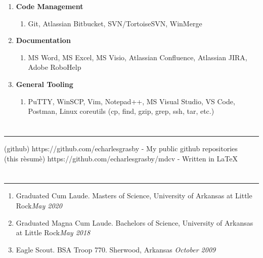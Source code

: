 \documentclass[11pt]{article}
\newcommand{\ualr}{University of Arkansas at Little Rock}
\newcommand{\uppr}[3]{ \noindent\MakeUppercase{{\fontsize{#2}{#3} \selectfont {#1}}} }
\begin{document}
\begin{enumerate}[topsep=0pt, partopsep=0pt, label=\null]
\begin{enumerate}[topsep=0pt, partopsep=0pt, label=\null]
  \end{enumerate}
\item \textbf{Code Management}
  \begin{enumerate}[topsep=0pt, partopsep=0pt, label=\null]
  \item Git, Atlassian Bitbucket, SVN/TortoiseSVN, WinMerge
  \end{enumerate}
\item \textbf{Documentation}
  \begin{enumerate}[topsep=0pt, partopsep=0pt, label=\null]
  \item MS Word, MS Excel, MS Visio, Atlassian Confluence, Atlassian JIRA, Adobe RoboHelp
  \end{enumerate}
\item \textbf{General Tooling}
  \begin{enumerate}[topsep=0pt, partopsep=0pt, label=\null]
  \item PuTTY, WinSCP, Vim, Notepad++, MS Visual Studio, VS Code, Postman, Linux coreutils (cp, find, gzip, grep, ssh, tar, etc.)
  \end{enumerate}

\end{enumerate}

\section*{\uppr{Projects}{14}{16}}\noindent \rule{1.0\textwidth}{0.4pt}
(github) https://github.com/echarlesgrasby - My public github repositories \\
(this r\`esum\`e) https://github.com/echarlesgrasby/mdcv - Written in {\LaTeX}
\section*{\uppr{Accolades}{14}{16}}\noindent \rule{1.0\textwidth}{0.4pt}
\setlength{\leftmargini}{0pt}
\begin{enumerate}[topsep=0pt, partopsep=0pt, label=\null]
\item Graduated Cum Laude. Masters of Science, \ualr \hfill \textit{May 2020}
\item Graduated Magna Cum Laude. Bachelors of Science, \ualr \hfill \textit{May 2018}
\item Eagle Scout. BSA Troop 770. Sherwood, Arkansas \hfill \textit{October 2009}
\end{enumerate}
\end{document}
